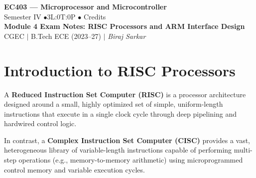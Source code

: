 \documentclass[12pt,a4paper]{article}
\begin{document}
\begin{center}
  {\LARGE\bfseries\color{myred} EC403 --- Microprocessor and Microcontroller}\\[5pt]
  {\normalsize\color{mydark} Semester IV \quad$\bullet$\quad 3L:0T:0P \quad$\bullet$ Credits}\\[3pt]
  {\normalsize\color{myteal}\textbf{Module 4 Exam Notes: RISC Processors and ARM Interface Design}}\\[3pt]
  {\small\color{mydark} CGEC \;$|$\; B.Tech ECE (2023--27) \;$|$\; \textit{Biraj Sarkar}}
\end{center}
\vspace{2pt}
\noindent{\color{myred}\rule{\linewidth}{1.5pt}}
\vspace{2pt}

\hypersetup{linkcolor=mydark}
\tableofcontents
\hypersetup{linkcolor=myteal}
\newpage

\section{Introduction to RISC Processors}

\begin{tcolorbox}[defbox, title={RISC vs. CISC Design Philosophy}]
A \textbf{Reduced Instruction Set Computer (RISC)} is a processor architecture designed around a small, highly optimized set of simple, uniform-length instructions that execute in a single clock cycle through deep pipelining and hardwired control logic.

In contrast, a \textbf{Complex Instruction Set Computer (CISC)} provides a vast, heterogeneous library of variable-length instructions capable of performing multi-step operations (e.g., memory-to-memory arithmetic) using microprogrammed control memory and variable execution cycles.
\end{tcolorbox}
\end{document}
